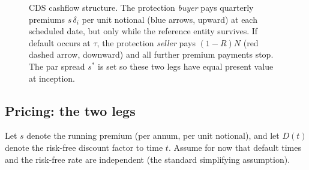 \begin{figure}[htbp]
\centering
{}
\caption{CDS cashflow structure. The protection \emph{buyer} pays quarterly premiums
$s\,\delta_i$ per unit notional (blue arrows, upward) at each scheduled date, but only
while the reference entity survives. If default occurs at $\tau$, the protection
\emph{seller} pays $(1-R)N$ (red dashed arrow, downward) and all further premium
payments stop. The par spread $s^*$ is set so these two legs have equal present value
at inception.}
\label{fig:cds_cashflows}
\end{figure}


\subsection{Pricing: the two legs}

Let $s$ denote the running premium (per annum, per unit notional),
and let $D(t)$ denote the risk-free discount factor to time $t$.
Assume for now that default times and the risk-free rate are
independent (the standard simplifying assumption).

